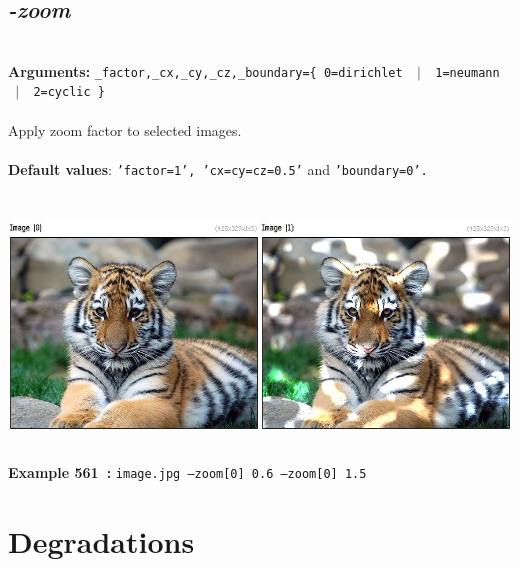\documentclass[a4paper,11pt,twoside]{book}
\begin{document}
\subsection{\emph{-zoom} }\vspace*{-0.5em}
~\\\textbf{Arguments: } 
{\small \texttt{\_factor,\_cx,\_cy,\_cz,\_boundary=\{ 0=dirichlet ~$|$~ 1=neumann ~$|$~ 2=cyclic \}}}\\~\\
Apply zoom factor to selected images.
~\\~\\\textbf{Default values}: {\small \texttt{'factor=1', 'cx=cy=cz=0.5'} and \texttt{'boundary=0'.}}
\begin{center}\includegraphics[keepaspectratio=true,height=7cm,width=\textwidth]{img/gmic_def561.jpg}\\
{\footnotesize \textbf{Example 561~:} \texttt{image.jpg --zoom[0] 0.6 --zoom[0] 1.5}}
\end{center}
\section{Degradations}
\end{document}
